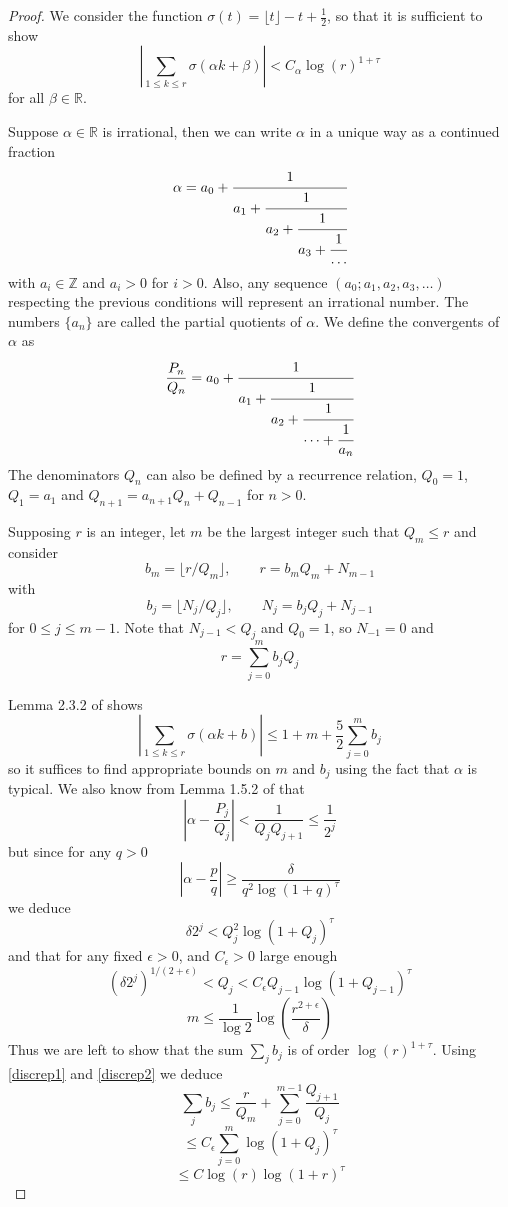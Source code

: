 \documentclass[12pt]{amsart}
\numberwithin{equation}{subsection}
\theoremstyle{definition}
\theoremstyle{plain}
\begin{document}
\begin{proof}
We consider the function $\sigma(t) = \lfloor t \rfloor - t + \frac{1}{2}$, so that
it is sufficient to show
\[
\left| \sum_{1 \leq k \leq r} \sigma(\alpha k + \beta) \right| < C_{\alpha} \log(r)^{1+\tau}
\]
for all $\beta \in \mathbb{R}$.

Suppose $\alpha \in \mathbb R$
is irrational,
then we can write $\alpha$ in a unique way as a continued fraction
\[
\alpha = a_0 + \cfrac{1}{a_1+\cfrac{1}{a_2+\cfrac{1}{a_3+\cfrac{1}{\dots}}}}
\]
with $a_i \in \mathbb Z$ and $a_i > 0$ for $i >0$.
Also, any sequence $(a_0;a_1,a_2,a_3,\dots)$
respecting the previous conditions will represent an irrational number.
The numbers $\{a_n\}$ are called the partial quotients of $\alpha$.
We define the convergents of $\alpha$ as
\[
\frac{P_n}{Q_n} = a_0 + \cfrac{1}{a_1+\cfrac{1}{a_2+\cfrac{1}{\dots+\cfrac{1}{a_n}}}}
\]
The denominators $Q_n$ can also be defined by a recurrence relation, $Q_0=1$, $Q_1=a_1$ and
$Q_{n+1}= a_{n+1}Q_n + Q_{n-1}$ for $n>0$.

Supposing $r$ is an integer,
let $m$ be the largest integer such that $Q_m \leq r$
and consider
\[
b_m = \lfloor r / Q_m \rfloor, \qquad r = b_m Q_m + N_{m-1}
\]
with
\begin{equation}
\label{discrep1}
b_j = \lfloor N_j / Q_j \rfloor, \qquad N_j = b_j Q_j + N_{j-1}
\end{equation}
for $0 \leq j \leq m-1$. Note that $N_{j-1} < Q_j$ and $Q_0=1$, so $N_{-1}=0$ and
\[
r = \sum_{j=0}^{m} b_j Q_j
\]

Lemma 2.3.2 of \cite{8} shows
\[
\left| \sum_{1 \leq k \leq r} \sigma(\alpha k +b) \right| \leq
1+ m + \frac{5}{2} \sum_{j=0}^{m} b_j
\]
so it suffices to find appropriate bounds on $m$ and $b_j$ using the fact that $\alpha$ is typical.
We also know from Lemma 1.5.2 of \cite{8} that
\[
\left| \alpha - \frac{P_j}{Q_j} \right| < \frac{1}{Q_{j} Q_{j+1}} \leq \frac{1}{2^j}
\]
but since for any $q > 0$
\[
\left| \alpha - \frac{p}{q} \right| \geq \frac{\delta}{q^2 \log(1+q)^{\tau}}
\]
we deduce
\[
\delta 2^j < Q_j^2 \log(1+Q_j)^{\tau}
\]
and that for any fixed $\epsilon > 0$, and $C_{\epsilon} > 0$ large enough
\begin{equation}
\label{discrep2}
\left( \delta 2^j \right)^{1/(2+\epsilon)} < Q_j < C_{\epsilon} Q_{j-1} \log(1+Q_{j-1})^{\tau}
\end{equation}
\begin{equation}
m \leq \frac{1}{\log 2} \log \left( \frac{r^{2+\epsilon}}{\delta} \right)
\end{equation}
Thus we are left to show that the sum $\sum_j b_j$ is of order $\log(r)^{1+\tau}$.
Using \eqref{discrep1} and \eqref{discrep2} we deduce
\[
\sum_j b_j \leq \frac{r}{Q_m} + \sum_{j=0}^{m-1} \frac{Q_{j+1}}{Q_j}
\]
\[
\leq C_{\epsilon} \sum_{j=0}^{m} \log(1+Q_{j})^{\tau}
\]
\[
\leq C \log(r) \log(1+r)^{\tau}
\]
\end{proof}
\end{document}
